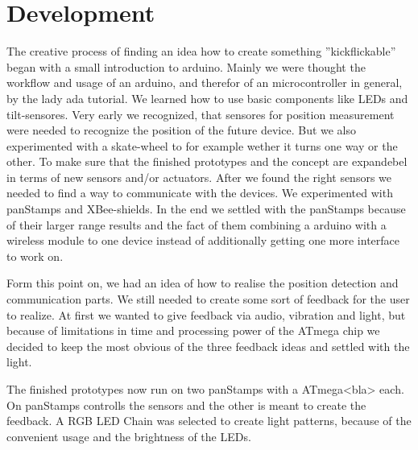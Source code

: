 \section{Development}
The creative process of finding an idea how to create something ''kickflickable'' began with a small introduction to arduino. Mainly we were thought the workflow and usage of an arduino, and therefor of an microcontroller in general, by the lady ada tutorial. \cite{lady_ada_arduino_tutorial}
We learned how to use basic components like LEDs and tilt-sensores. Very early we recognized, that sensores for position measurement were needed to recognize the position of the future device. But we also experimented with a skate-wheel to for example wether it turns one way or the other. To make sure that the finished prototypes and the concept are expandebel in terms of new sensors and/or actuators.
After we found the right sensors we needed to find a way to communicate with the devices. We experimented with panStamps \cite{panstamp} and XBee\cite{xbee}-shields. In the end we settled with the panStamps because of their larger range results and the fact of them combining a arduino with a wireless module to one device instead of additionally getting one more interface to work on.

Form this point on, we had an idea of how to realise the position detection and communication parts. We still needed to create some sort of feedback for the user to realize. 
At first we wanted to give feedback via audio, vibration and light, but because of limitations in time and processing power of the ATmega %
 chip we decided to keep the most obvious of the three feedback ideas and settled with the light.

The finished prototypes now run on two panStamps with a ATmega<bla> each. On panStamps controlls the sensors and the other is meant to create the feedback. 
A RGB LED Chain was selected to create light patterns, because of the convenient usage and the brightness of the LEDs. 

